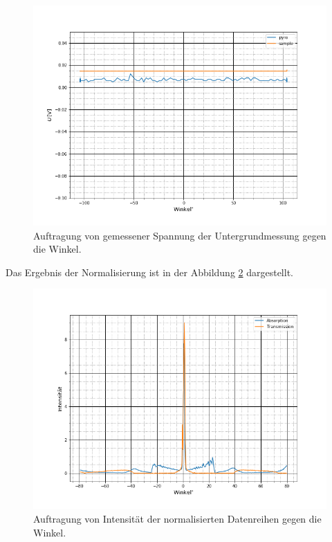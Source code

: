 \begin{figure}[h]
	\centering

	\includegraphics[scale=0.5]{Bilder/Hintergrund}
	\caption{\small Auftragung von gemessener Spannung der  Untergrundmessung gegen die Winkel.}
	\label{untergrund}	
\end{figure}

Das Ergebnis der Normalisierung ist in der Abbildung \ref{normalized} dargestellt.

\begin{figure}[h]
	\centering

	\includegraphics[scale=0.5]{Bilder/normalized}
	\caption{\small Auftragung von Intensität der normalisierten Datenreihen gegen die  Winkel.}
	\label{normalized}	
\end{figure}

